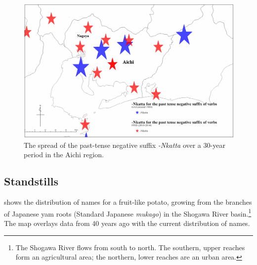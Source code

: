 \documentclass[output=paper]{LSP/langsci}
\begin{document}
\begin{figure}
\includegraphics[width=\textwidth]{illustrations/onishi_fig6}
\caption{The spread of the past-tense negative suffix \textit{-Nkatta} over a 30-year period in the Aichi region.}
\label{fig:6}
\end{figure}

\subsection{Standstills}
 shows the distribution of names for a fruit-like potato, growing from the branches of Japanese yam roots (Standard Japanese \textit{mukago}) in the Shogawa River basin.\footnote{ The Shogawa River flows from south to north. The southern, upper reaches form an agricultural area; the northern, lower reaches are an urban area.} The map overlays data from 40 years ago with the current distribution of names.
\end{document}
